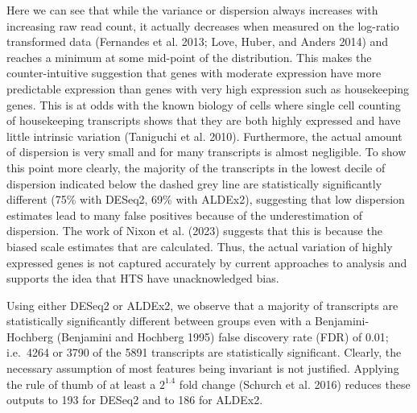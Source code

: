 \documentclass[
]{article}
\begin{document}
Here we can see that while the variance or dispersion always increases
with increasing raw read count, it actually decreases when measured on
the log-ratio transformed data (Fernandes et al. 2013; Love, Huber, and
Anders 2014) and reaches a minimum at some mid-point of the
distribution. This makes the counter-intuitive suggestion that genes
with moderate expression have more predictable expression than genes
with very high expression such as housekeeping genes. This is at odds
with the known biology of cells where single cell counting of
housekeeping transcripts shows that they are both highly expressed and
have little intrinsic variation (Taniguchi et al. 2010). Furthermore,
the actual amount of dispersion is very small and for many transcripts
is almost negligible. To show this point more clearly, the majority of
the transcripts in the lowest decile of dispersion indicated below the
dashed grey line are statistically significantly different (75\% with
DESeq2, 69\% with ALDEx2), suggesting that low dispersion estimates lead
to many false positives because of the underestimation of dispersion.
The work of Nixon et al. (2023) suggests that this is because the biased
scale estimates that are calculated. Thus, the actual variation of
highly expressed genes is not captured accurately by current approaches
to analysis and supports the idea that HTS have unacknowledged bias.

Using either DESeq2 or ALDEx2, we observe that a majority of transcripts
are statistically significantly different between groups even with a
Benjamini-Hochberg (Benjamini and Hochberg 1995) false discovery rate
(FDR) of 0.01; i.e.~4264 or 3790 of the 5891 transcripts are
statistically significant. Clearly, the necessary assumption of most
features being invariant is not justified. Applying the rule of thumb of
at least a \(2^{1.4}\) fold change (Schurch et al. 2016) reduces these
outputs to 193 for DESeq2 and to 186 for ALDEx2.
\end{document}
